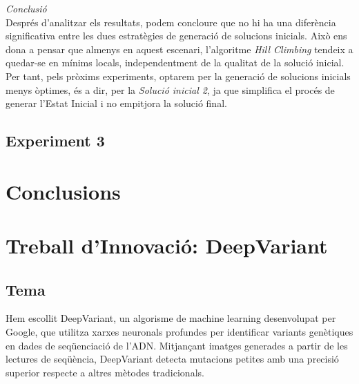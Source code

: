 \documentclass[a4paper]{article}
\begin{document}
	\textit{Conclusió} \\
	Després d'analitzar els resultats, podem concloure que no hi ha una diferència significativa entre les dues estratègies de generació de solucions inicials. Això ens dona a pensar que almenys en aquest escenari, l'algoritme \textit{Hill Climbing} tendeix a quedar-se en mínims locals, independentment de la qualitat de la solució inicial. Per tant, pels pròxims experiments, optarem per la generació de solucions inicials menys òptimes, és a dir, per la \textit{Solució inicial 2}, ja que simplifica el procés de generar l'Estat Inicial i no empitjora la solució final.\\
	
	\subsection{Experiment 3}
	
	\newpage
	\section{Conclusions}
	
	
	\newpage
	\section{Treball d'Innovació: DeepVariant}
	
	\subsection{Tema}
	Hem escollit DeepVariant, un algorisme de machine learning desenvolupat per Google, que utilitza xarxes neuronals profundes per identificar variants genètiques en dades de seqüenciació de l'ADN. Mitjançant imatges generades a partir de les lectures de seqüència, DeepVariant detecta mutacions petites amb una precisió superior respecte a altres mètodes tradicionals.
	
\end{document}
